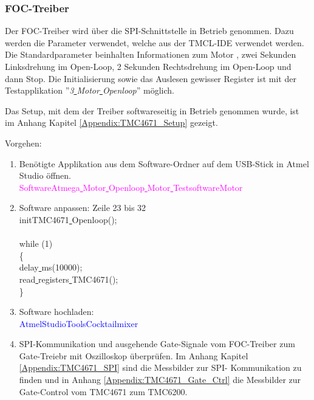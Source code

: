 \subsubsection{FOC-Treiber}
\label{subsubsec:Inbetriebnahme_FOC_Treiber}

Der FOC-Treiber wird über die SPI-Schnittstelle in Betrieb genommen. Dazu werden die Parameter verwendet, welche aus der TMCL-IDE verwendet werden. Die Standardparameter beinhalten Informationen zum Motor , zwei Sekunden Linksdrehung im Open-Loop, 2 Sekunden Rechtsdrehung im Open-Loop und dann Stop. Die Initialisierung sowie das Auslesen gewisser Register ist mit der Testapplikation ''\textit{3\underline{ }Motor\underline{ }Openloop}'' möglich.

Das Setup, mit dem der Treiber softwareseitig in Betrieb genommen wurde, ist im Anhang Kapitel \ref{Appendix:TMC4671_Setup} gezeigt.

Vorgehen:
\begin{enumerate}
\item Benötigte Applikation aus dem Software-Ordner auf dem USB-Stick in Atmel Studio öffnen.\\
\textcolor{magenta}{Software\textrightarrow Atmega\underline{ }Motor\underline{ }Openloop\underline{ }Motor\underline{ }Testsoftware\textrightarrow Motor}\\

\item Software anpassen: Zeile 23 bis 32\\
\textcolor{OliveGreen}{
	initTMC4671\underline{ }Openloop();\\
\\
    while (1) \\
    \{\\
		\underline{ }delay\underline{ }ms(10000);\\
		read\underline{ }registers\underline{ }TMC4671();\\
    \}
}\\

\item Software hochladen:\\
\textcolor{blue}{AtmelStudio\textrightarrow Tools\textrightarrow Cocktailmixer}\\

\item SPI-Kommunikation und ausgehende Gate-Signale vom FOC-Treiber zum Gate-Treiebr mit Oszilloskop überprüfen. Im Anhang Kapitel \ref{Appendix:TMC4671_SPI} sind die Messbilder zur SPI- Kommunikation zu finden und in Anhang \ref{Appendix:TMC4671_Gate_Ctrl} die Messbilder zur Gate-Control vom TMC4671 zum TMC6200.
\end{enumerate}